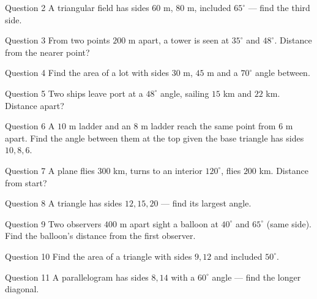 \documentclass[11pt]{article}
\begin{document}
\begin{qbox}{Question 2}
A triangular field has sides $60$ m, $80$ m, included $65^\circ$ — find the third side.\workspace{2.4cm}
\end{qbox}

\begin{qbox}{Question 3}
From two points $200$ m apart, a tower is seen at $35^\circ$ and $48^\circ$. Distance from the nearer point?\workspace{2.4cm}
\end{qbox}

\begin{qbox}{Question 4}
Find the area of a lot with sides $30$ m, $45$ m and a $70^\circ$ angle between.\workspace{2.4cm}
\end{qbox}

\begin{qbox}{Question 5}
Two ships leave port at a $48^\circ$ angle, sailing $15$ km and $22$ km. Distance apart?\workspace{2.4cm}
\end{qbox}

\begin{qbox}{Question 6}
A $10$ m ladder and an $8$ m ladder reach the same point from $6$ m apart. Find the angle between them at the top given the base triangle has sides $10,8,6$.\workspace{2.4cm}
\end{qbox}

\begin{qbox}{Question 7}
A plane flies $300$ km, turns to an interior $120^\circ$, flies $200$ km. Distance from start?\workspace{2.4cm}
\end{qbox}

\begin{qbox}{Question 8}
A triangle has sides $12,15,20$ — find its largest angle.\workspace{2.4cm}
\end{qbox}

\begin{qbox}{Question 9}
Two observers $400$ m apart sight a balloon at $40^\circ$ and $65^\circ$ (same side). Find the balloon's distance from the first observer.\workspace{2.4cm}
\end{qbox}

\begin{qbox}{Question 10}
Find the area of a triangle with sides $9,12$ and included $50^\circ$.\workspace{2.4cm}
\end{qbox}

\begin{qbox}{Question 11}
A parallelogram has sides $8,14$ with a $60^\circ$ angle — find the longer diagonal.\workspace{2.4cm}
\end{qbox}
\end{document}
